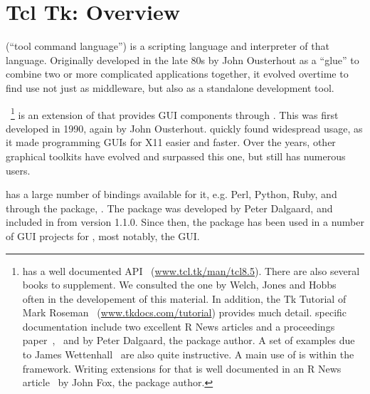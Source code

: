  
\newcommand{\Event}[1]{$<$#1$>$}
\newcommand{\VirtualEvent}[1]{$<<$#1$>>$}



\chapter{Tcl Tk: Overview}
\label{sec:tcltk:overview}

\TCL\/ (``tool command language'') is a scripting language and
interpreter of that language.  Originally developed in the late 80s by
John Ousterhout as a ``glue'' to combine two or more complicated
applications together, it evolved overtime to find use not just as
middleware, but also as a standalone development tool.

\TK~\footnote{
  \Tk{} has a well documented API~\citep{TclTk:Api}
  (\url{www.tcl.tk/man/tcl8.5}).  There are also several books
  to supplement. We consulted the one by Welch, Jones and
  Hobbs~\citep{beedub} often in the developement of this material. In
  addition, the Tk Tutorial of Mark Roseman~\citep{TclTk:Tutorial}
  (\url{www.tkdocs.com/tutorial}) provides much detail. \R{} specific
  documentation include two excellent R News
  articles and a proceedings paper~\citep{Rnews:Dalgaard:2001a},~\citep{Rnewse:Dalgaard:2002}
  and \citep{Dalgaard-DSC} by Peter Dalgaard, the
  package author. A set of examples due to James
  Wettenhall~\citep{Wettenhall} are also quite instructive. A main use
  of  is within the  framework. Writing
  extensions for that is well documented in an R News
  article~\citep{Rnews:Fox:2007} by John Fox, the package author.
}
 is an extension of \TCL\/ that provides GUI components through
\TCL.  This was first developed in 1990, again by John
Ousterhout. \TK\/ quickly found widespread usage, as it made
programming GUIs for X11 easier and faster. Over the years, other
graphical toolkits have evolved and surpassed this one, but \TK\/
still has numerous users.

\TK\/ has a large number of bindings available for it, e.g. Perl, Python,
Ruby, and through the  package, \R. The  package
was developed by Peter Dalgaard, and  included in \R\/ from version
1.1.0. Since then, the package has been used in a number of GUI 
projects for \R,  most notably, the  GUI.

